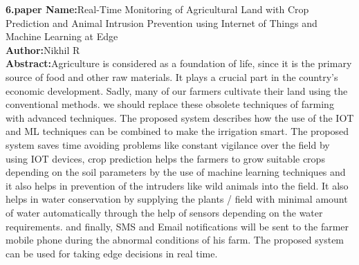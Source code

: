 \documentclass[oneside,a4paper,12pt]{report}
\begin{document}
\newpage

\item \textbf{6.paper Name:}Real-Time Monitoring of Agricultural Land with Crop 
Prediction and Animal Intrusion Prevention using 
Internet of Things and Machine Learning at Edge\\
\textbf{Author:}Nikhil R \\
\textbf{Abstract:}Agriculture is considered as a foundation of life, 
since it is the primary source of food and other raw materials. 
It plays a crucial part in the country's economic development. 
Sadly, many of our farmers cultivate their land using the 
conventional methods. we should replace these obsolete 
techniques of farming with advanced techniques. The 
proposed system describes how the use of the IOT and ML 
techniques can be combined to make the irrigation smart. 
The proposed system saves time avoiding problems like 
constant vigilance over the field by using IOT devices, crop 
prediction helps the farmers to grow suitable crops 
depending on the soil parameters by the use of machine 
learning techniques and it also helps in prevention of the 
intruders like wild animals into the field. It also helps in water 
conservation by supplying the plants / field with minimal 
amount of water automatically through the help of sensors 
depending on the water requirements. and finally, SMS and 
Email notifications will be sent to the farmer mobile phone 
during the abnormal conditions of his farm. The proposed 
system can be used for taking edge decisions in real time. \\
\end{document}
